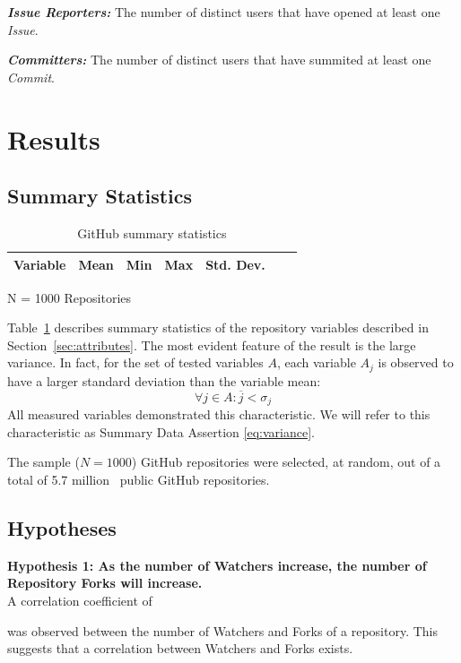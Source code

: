\documentclass{proc}
\begin{document}
{{{{{{{\noindent \textbf{\textit{Issue Reporters:}}
The number of distinct users that have opened at least one \textit{Issue}.

\noindent \textbf{\textit{Committers:}}
The number of distinct users that have summited at least one \textit{Commit}.

\section{Results}

\subsection{Summary Statistics}
\label{sec:summary_statistics}
\begin{table}[!ht]
\begin{center}
\begin{tabular}{rrrrrrr}
\hline
Variable & Mean & Min & Max & Std. Dev. \\
\hline

\hline
\end{tabular}
N = 1000 Repositories
\caption{GitHub summary statistics}
\label{table:summary_stats}
\end{center}
\end{table}

Table~\ref{table:summary_stats} describes summary statistics of the repository variables described in Section~\ref{sec:attributes}. The most evident feature of the result is the large variance. In fact, for the set of tested variables $A$, each variable $A_j$ is observed to have a larger standard deviation than the variable mean:
\begin{equation}
\forall j \in A \colon \overline{j} < \sigma_{j}
\label{eq:variance}
\end{equation}
All measured variables demonstrated this characteristic. We will refer to this characteristic as Summary Data Assertion \ref{eq:variance}.

The sample ($N = 1000$) GitHub repositories were selected, at random, out of a total of 5.7 million~\cite{githubPress} public GitHub repositories.

\subsection{Hypotheses}
\noindent \textbf{Hypothesis 1: As the number of Watchers increase, the number of Repository Forks will increase.}\\
A correlation coefficient of } was observed between the number of Watchers and Forks of a repository. This suggests that a correlation between Watchers and Forks exists.

}}}}}}
\end{document}
